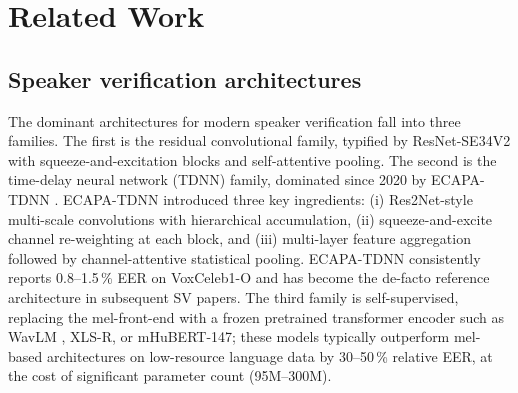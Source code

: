 
\chapter{Related Work}
\label{ch:related}

\section{Speaker verification architectures}
\label{sec:related-architectures}

The dominant architectures for modern speaker verification fall into
three families. The first is the residual convolutional family,
typified by ResNet-SE34V2 with squeeze-and-excitation blocks and
self-attentive pooling. The second is the time-delay neural network
(TDNN) family, dominated since 2020 by ECAPA-TDNN
\cite{desplanques2020ecapa}. ECAPA-TDNN introduced three key
ingredients: (i) Res2Net-style multi-scale convolutions with
hierarchical accumulation, (ii) squeeze-and-excite channel
re-weighting at each block, and (iii) multi-layer feature
aggregation followed by channel-attentive statistical pooling.
ECAPA-TDNN consistently reports 0.8--1.5\,\% EER on VoxCeleb1-O and
has become the de-facto reference architecture in subsequent SV
papers. The third family is self-supervised, replacing the
mel-front-end with a frozen pretrained transformer encoder such as
WavLM \cite{chen2022wavlm}, XLS-R, or mHuBERT-147; these models
typically outperform mel-based architectures on low-resource
language data by 30--50\,\% relative EER, at the cost of significant
parameter count (95M--300M).


